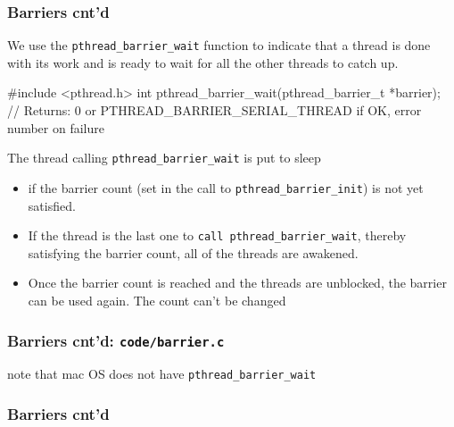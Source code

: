\documentclass[newPxFont,sthlmFooter,nooffset]{beamer}
\begin{document}
\begin{frame}[t, fragile]
  \frametitle{Barriers cnt'd}
We use the \texttt{pthread\_barrier\_wait} function to indicate that a thread is done with its work and is ready to wait for all the other threads to catch up.
\begin{codedef}
#include <pthread.h>
int pthread_barrier_wait(pthread_barrier_t *barrier);
// Returns: 0 or PTHREAD_BARRIER_SERIAL_THREAD if OK, error number on failure
\end{codedef}
The thread calling \texttt{pthread\_barrier\_wait} is put to sleep
\begin{itemize}
\item if the barrier count (set in the call to \texttt{pthread\_barrier\_init})
  is not yet satisfied.
\item If the thread is the last one to \texttt{call pthread\_barrier\_wait}, thereby satisfying the barrier count, all of the threads are awakened.
\item Once the barrier count is reached and the threads are unblocked, the barrier can be used again. The count can't be changed
\end{itemize}

\end{frame}


\begin{frame}
  \frametitle{Barriers cnt'd: \texttt{code/barrier.c}}

note that mac OS does not have \texttt{pthread\_barrier\_wait}


\end{frame}


\begin{frame}[t]
  \frametitle{Barriers cnt'd}

\end{frame}

\end{document}
